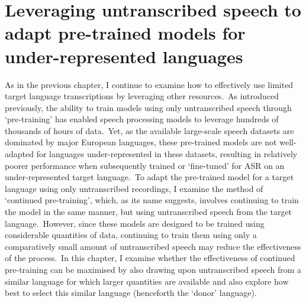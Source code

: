 \documentclass[main.tex]{subfiles}
\begin{document}

\vspace{2em}

\chapter{Leveraging untranscribed speech to adapt pre-trained models for under-represented languages}

\vspace{2em}

As in the previous chapter, I continue to examine how to effectively use limited target language transcriptions by leveraging other resources.~As introduced previously, the ability to train models using only untranscribed speech through `pre-training' has enabled speech processing models to leverage hundreds of thousands of hours of data.~Yet, as the available large-scale speech datasets are dominated by major European languages, these pre-trained models are not well-adapted for languages under-represented in these datasets, resulting in relatively poorer performance when subsequently trained or `fine-tuned' for ASR on an under-represented target language.~To adapt the pre-trained model for a target language using only untranscribed recordings, I examine the method of `continued pre-training', which, as its name suggests, involves continuing to train the model in the same manner, but using untranscribed speech from the target language.~However, since these models are designed to be trained using considerable quantities of data, continuing to train them using only a comparatively small amount of untranscribed speech may reduce the effectiveness of the process.~In this chapter, I examine whether the effectiveness of continued pre-training can be maximised by also drawing upon untranscribed speech from a similar language for which larger quantities are available and also explore how best to select this similar language (henceforth the `donor' language).
\end{document}
